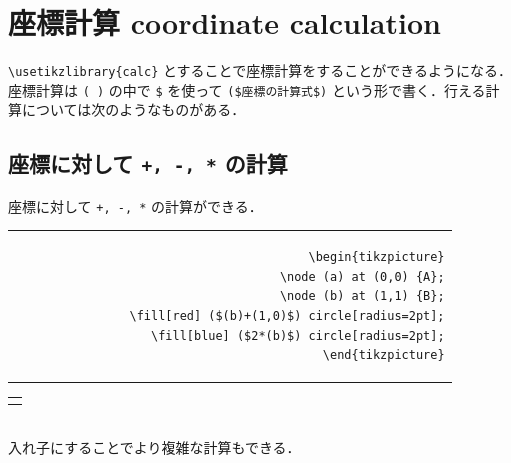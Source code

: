 \documentclass[lualatex]{jlreq}
\begin{document}
\section{座標計算 coordinate calculation}

\verb|\usetikzlibrary{calc}| とすることで座標計算をすることができるようになる．座標計算は \verb|( )| の中で \verb|$| を使って \verb|($座標の計算式$)| という形で書く．行える計算については次のようなものがある．

\subsection{座標に対して \texttt{+, -, *} の計算}

座標に対して \texttt{+, -, *} の計算ができる．
\\[0.5em]
\begin{minipage}{0.58 \textwidth}
    \begin{flushright}
        \begin{tabular}{r}
            \begin{lstlisting}[language={[LaTeX] TeX},
            numbers=none,breaklines=true,gobble=12,frame=none]
            \begin{tikzpicture}
                \node (a) at (0,0) {A};
                \node (b) at (1,1) {B};
                \fill[red] ($(b)+(1,0)$) circle[radius=2pt];
                \fill[blue] ($2*(b)$) circle[radius=2pt];
            \end{tikzpicture}
            \end{lstlisting}
        \end{tabular}
    \end{flushright}
\end{minipage}
\hfill
\begin{minipage}{0.34 \textwidth}
    \begin{flushleft}
        \begin{tabular}{l}
            \begin{tikzpicture}
                \node (a) at (0,0) {A};
                \node (b) at (1,1) {B};
                \fill[red] ($(b)+(1,0)$) circle[radius=2pt];
                \fill[blue] ($2*(b)$) circle[radius=2pt];
            \end{tikzpicture}
        \end{tabular}
    \end{flushleft}
\end{minipage}
\\[1em]
入れ子にすることでより複雑な計算もできる．
\end{document}
